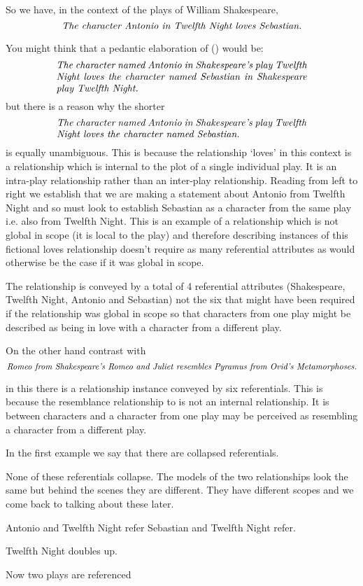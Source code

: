 \begin{newtt}
\mynote 
So we have, in the context of the plays of William Shakespeare,
\begin{equation}
\label{AntonioLovesSebastian}
\mbox{\textit{The character Antonio in Twelfth Night loves Sebastian.}}
\end{equation} 

You might think that a pedantic elaboration of (\label{AntonioLovesSebastian}) would be:
\begin{equation}
\text{\parbox{9cm}{\textit{The character named Antonio in Shakespeare's play Twelfth Night loves the character named Sebastian in Shakespeare play Twelfth Night.}}}
\end{equation} 
but there is a reason why the shorter
\begin{equation}
\text{\parbox{9cm}{\textit{The character named Antonio in Shakespeare's play Twelfth Night loves the character named Sebastian.}}}
\end{equation} 
is equally unambiguous. This is because the relationship `loves' in this context is a relationship which is internal to the plot of a single individual play. 
It is an intra-play relationship rather than an inter-play relationship.
Reading from left to right we establish that we are making a statement about 
Antonio from Twelfth Night  and so must look to establish Sebastian as a character from the same play i.e. also from Twelfth Night. This is an example of a relationship which is not global in scope (it is local to the play) and therefore describing instances of this fictional loves relationship
doesn't require as many referential attributes as would otherwise be the case if it was global in scope. 

The relationship is conveyed by a total of  4 referential attributes
(Shakespeare, Twelfth Night, Antonio and Sebastian) not the six that might have been required
if the relationship was global in scope so that characters from one play might be described as being in love with a character from a different play.

On the other hand contrast with
\begin{equation}
\mbox{\textit{Romeo from Shakespeare's Romeo and Juliet resembles Pyramus from Ovid's 
Metamorphoses.}}
\end{equation}

in this there is a relationship instance conveyed by six referentials. This is because the resemblance relationship to is not an internal relationship. It is between characters and a character from one play may be perceived as resembling a character from a different play.

In the first example we say that there are collapsed referentials. 

None of these referentials collapse. The models of the two relationships
look the same but behind the scenes they are different. They have different scopes and we come back to talking about these later.

Antonio and Twelfth Night refer
Sebastian and Twelfth Night refer.

Twelfth Night doubles up.

Now two plays are referenced 
 \end{newtt}


